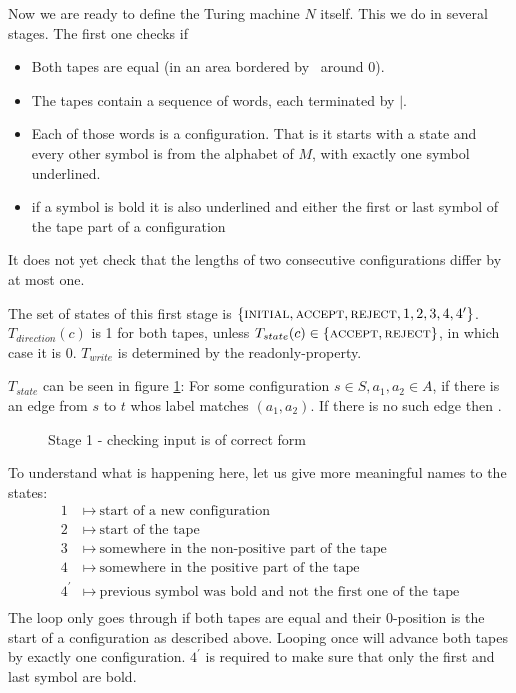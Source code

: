 	Now we are ready to define the Turing machine $N$ itself. This we do in several stages. The first one checks if
	\begin{itemize}
		\item { Both tapes are equal (in an area bordered by \EMP~around $0$). }
		\item { The tapes contain a sequence of words, each terminated by $|$. }
		\item { Each of those words is a configuration. That is it starts with a state and every other symbol is from the alphabet of $M$, with exactly one symbol underlined. }
		\item { if a symbol is bold it is also underlined and either the first or last symbol of the tape part of a configuration }
	\end{itemize}
	It does not yet check that the lengths of two consecutive configurations differ by at most one.

	The set of states of this first stage is $\{\text{\scshape{initial}},\text{\scshape{accept}},\text{\scshape{reject}},1,2,3,4,4^\prime\}$.
	$T_{direction}(c)$ is 1 for both tapes, unless $T_{state}(c) \in \{\text{\scshape{accept}},\text{\scshape{reject}}\}$, in which case it is 0. $T_{write}$ is determined by the readonly-property.

	$T_{state}$ can be seen in figure \ref{turing_machines:main_theorem:fig_stage1}:
	For some configuration $s \in S, a_1,a_2 \in A$,  if there is an edge from $s$ to $t$ whos label matches $(a_1,a_2)$.
	If there is no such edge then .

	\begin{figure}
		\centering
		
		\caption{Stage 1 - checking input is of correct form}
		\label{turing_machines:main_theorem:fig_stage1}
	\end{figure}

	To understand what is happening here, let us give more meaningful names to the states:
	\begin{align*}
		1 &\mapsto~\text{start of a new configuration} \\
		2 &\mapsto~\text{start of the tape} \\
		3 &\mapsto~\text{somewhere in the non-positive part of the tape} \\
		4 &\mapsto~\text{somewhere in the positive part of the tape} \\
		4^\prime &\mapsto~\text{previous symbol was bold and not the first one of the tape} \\
	\end{align*}
	The loop  only goes through if both tapes are equal and their $0$-position is the start of a configuration as described above.
	Looping once will advance both tapes by exactly one configuration.
	$4^\prime$ is required to make sure that only the first and last symbol are bold.

